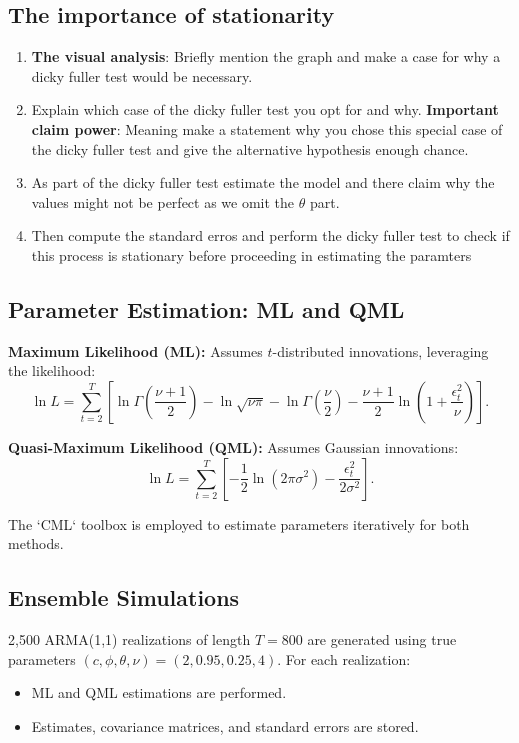 \documentclass[a4paper,12pt]{article}
\begin{document}
\subsection{The importance of stationarity}
\begin{enumerate}
    \item \textbf{The visual analysis}: Briefly mention the graph and make a case for why a dicky fuller test would be necessary. 
    \item Explain which case of the dicky fuller test you opt for and why. \textbf{Important claim power}: Meaning make a statement why you chose this special case of the dicky fuller test and give the alternative hypothesis enough chance. 
    \item As part of the dicky fuller test estimate the model and there claim why the values might not be perfect as we omit the $\theta$ part.
    \item Then compute the standard erros and perform the dicky fuller test to check if this process is stationary before proceeding in estimating the paramters
\end{enumerate}


\subsection{Parameter Estimation: ML and QML}
\textbf{Maximum Likelihood (ML):} Assumes \(t\)-distributed innovations, leveraging the likelihood:
\[
\ln L = \sum_{t=2}^T \left[ \ln \Gamma\left(\frac{\nu+1}{2}\right) - \ln \sqrt{\nu\pi} - \ln \Gamma\left(\frac{\nu}{2}\right) - \frac{\nu+1}{2} \ln\left(1 + \frac{\epsilon_t^2}{\nu}\right) \right].
\]

\textbf{Quasi-Maximum Likelihood (QML):} Assumes Gaussian innovations:
\[
\ln L = \sum_{t=2}^T \left[-\frac{1}{2}\ln(2\pi\sigma^2) - \frac{\epsilon_t^2}{2\sigma^2}\right].
\]

The `CML` toolbox is employed to estimate parameters iteratively for both methods.

\subsection{Ensemble Simulations}
2,500 ARMA(1,1) realizations of length \(T = 800\) are generated using true parameters \((c, \phi, \theta, \nu) = (2, 0.95, 0.25, 4)\). For each realization:
\begin{itemize}
    \item ML and QML estimations are performed.
    \item Estimates, covariance matrices, and standard errors are stored.
\end{itemize}
\end{document}
